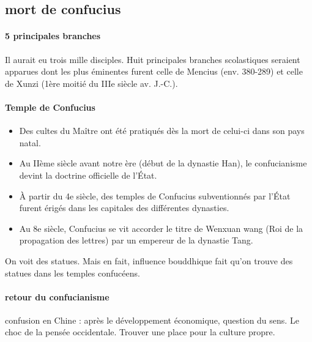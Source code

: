 \subsection{mort de confucius}
\paragraph{5 principales branches}
Il aurait eu trois mille disciples. Huit principales branches scolastiques  seraient apparues dont les plus éminentes furent celle de Mencius (env. 380-289) et celle de Xunzi (1ère moitié du IIIe siècle av. J.-C.).


\paragraph{Temple de Confucius}
\begin{itemize}
    \item  Des cultes du Maître ont été pratiqués dès la mort de celui-ci dans son pays natal.
  \item 	Au IIème siècle avant notre ère (début de la dynastie Han), le confucianisme devint la doctrine officielle de l’État.
  \item À partir du 4e siècle, des temples de Confucius subventionnés par l’État furent érigés dans les capitales des différentes dynasties.
  \item Au 8e siècle, Confucius se vit accorder le titre de Wenxuan wang (Roi de la propagation des lettres) par un empereur de la dynastie Tang.

\end{itemize}
\begin{Ex}
    On voit des statues. Mais en fait, influence bouddhique fait qu'on trouve des statues dans les temples confucéens.
\end{Ex}
\paragraph{retour du confucianisme} confusion en Chine : après le développement économique, question du sens. Le choc de la pensée occidentale. Trouver une place pour la culture propre. 